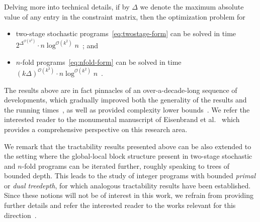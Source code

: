 \documentclass{theoretics}
\newcommand{\Oh}{{\mathcal{O}}}
\begin{document}
Delving more into technical details, if by $\Delta$ we denote the maximum absolute value of any entry in the constraint matrix, then the optimization problem for
\begin{itemize}[nosep]
    \item two-stage stochastic programs~\cref{eq:twostage-form} can be solved in time \mbox{$2^{\Delta^{\Oh(k^2)}}\cdot n\log^{\Oh(k^2)} n$}~\cite{CslovjecsekEPVW21}; and
    \item $n$-fold programs~\cref{eq:nfold-form} can be solved in time $(k\Delta)^{\Oh(k^3)}\cdot n\log^{\Oh(k^2)} n$~\cite{CslovjecsekEHRW21}.
\end{itemize}
The results above are in fact pinnacles of an over-a-decade-long sequence of developments, which gradually improved both the generality of the results and the running times~\cite{AschenbrennerH07,CslovjecsekEHRW21,CslovjecsekEPVW21,DeLoera2008,EisenbrandHK18,monster,HemmeckeOR13,JansenLR20,DBLP:journals/mp/Klein22,KouteckyLO18}, as well as provided complexity lower bounds~\cite{JansenKL23,KnopPW20}. We refer the interested reader to the monumental manuscript of Eisenbrand et al.~\cite{monster} which provides a comprehensive perspective on this research area.

We remark that the tractability results presented above can be also extended to the setting where the global-local block structure present in two-stage stochastic and $n$-fold programs can be iterated further, roughly speaking to trees of bounded depth. This leads to the study of integer programs with bounded {\em{primal}} or {\em{dual treedepth}}, for which analogous tractability results have been established. Since these notions will not be of interest in this work, we refrain from providing further details and refer the interested reader to the works relevant for this direction~\cite{BrianskiKKPS22,ChanCKKP22,ChenM18,CslovjecsekEHRW21,CslovjecsekEPVW21,EisenbrandHK18,monster,DBLP:journals/mp/Klein22,KleinR22,KnopPW20,KouteckyLO18}.
\end{document}
